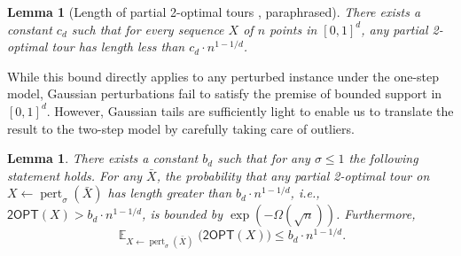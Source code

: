 \documentclass[11pt,DIV=12,a4paper]{scrartcl}
\newtheorem{lemma}[claim]{Lemma}
\DeclareMathOperator{\expected}{\mathbb{E}}
\newcommand{\todo}[1]{\fbox{\bfseries\boldmath TODO: #1}}
\newcommand{\TwoOPT}{\mathsf{2OPT}}
\DeclareMathOperator{\pert}{pert}
\begin{document}
\begin{lemma}[Length of partial 2-optimal tours , paraphrased]
\label{lem:2optworst}
There exists a constant $c_d$ such that for every sequence $X$ of $n$ points in $[0,1]^d$, any partial 2-optimal tour has length less than $c_d \cdot n^{1-1/d}$.
\end{lemma}

While this bound directly applies to any perturbed instance under the one-step model, Gaussian perturbations fail to satisfy the premise of bounded
support in $[0,1]^d$. However, Gaussian tails are sufficiently light to enable us to translate the result to the two-step model by carefully taking care of outliers.

\begin{lemma}\label{lem:2optSigma1}
There exists a constant $b_d$ such that for any $\sigma \le 1$ the following statement holds.  For any $\bar{X}$, the probability that any partial 2-optimal tour on $X\leftarrow \pert_\sigma(\bar X)$ has length greater than $b_d \cdot n^{1-1/d}$, i.e.,
$\TwoOPT(X) > b_d\cdot n^{1-1/d}$, is bounded by $\exp(-\Omega(\sqrt{n}))$. Furthermore, 
\[
   \expected_{X\leftarrow \pert_\sigma(\bar X)}\bigl (\TwoOPT(X)\bigr) \le b_d\cdot  n^{1-1/d}.
\]
\end{lemma}
\end{document}
